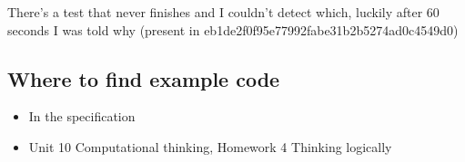 \documentclass{article}
\begin{document}
There's a test that never finishes and I couldn't detect which, luckily after
60 seconds I was told why (present in eb1de2f0f95e77992fabe31b2b5274ad0c4549d0)

\subsection{Where to find example code}

\begin{itemize}
	\item In the specification
	\item Unit 10 Computational thinking, Homework 4 Thinking logically
\end{itemize}

\printbibliography[heading=bibintoc]
\end{document}
